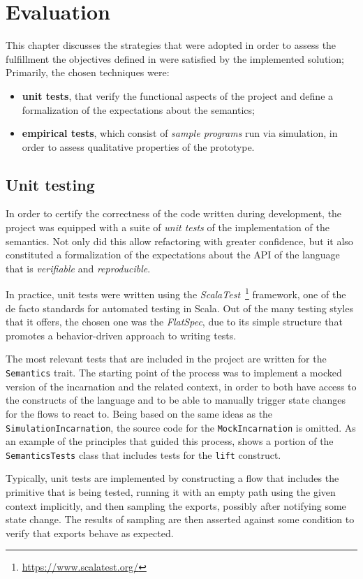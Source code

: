 \chapter{Evaluation}
\label{chap:evaluation}

This chapter discusses the strategies that were adopted in order to assess the fulfillment the objectives defined in  were satisfied by the implemented solution;
%
Primarily, the chosen techniques were:
%
\begin{itemize}
    \item \textbf{unit tests}, that verify the functional aspects of the project and define a formalization of the expectations about the semantics;
    \item \textbf{empirical tests}, which consist of \textit{sample programs} run via simulation, in order to assess qualitative properties of the prototype.
\end{itemize}

\section{Unit testing}

In order to certify the correctness of the code written during development, the project was equipped with a suite of \textit{unit tests} of the implementation of the semantics.
%
Not only did this allow refactoring with greater confidence, but it also constituted a formalization of the expectations about the API of the language that is \textit{verifiable} and \textit{reproducible}.

In practice, unit tests were written using the \textit{ScalaTest}~\footnote{\url{https://www.scalatest.org/}} framework, one of the de facto standards for automated testing in Scala.
%
Out of the many testing styles that it offers, the chosen one was the \textit{FlatSpec}, due to its simple structure that promotes a behavior-driven approach to writing tests.

The most relevant tests that are included in the project are written for the \texttt{Semantics} trait.
%
The starting point of the process was to implement a mocked version of the incarnation and the related context, in order to both have access to the constructs of the language and to be able to manually trigger state changes for the flows to react to.
%
Being based on the same ideas as the \texttt{SimulationIncarnation}, the source code for the \texttt{MockIncarnation} is omitted.
%
As an example of the principles that guided this process,  shows a portion of the \texttt{SemanticsTests} class that includes tests for the \texttt{lift} construct.
%

%
Typically, unit tests are implemented by constructing a flow that includes the primitive that is being tested, running it with an empty path using the given context implicitly, and then sampling the exports, possibly after notifying some state change.
%
The results of sampling are then asserted against some condition to verify that exports behave as expected.

